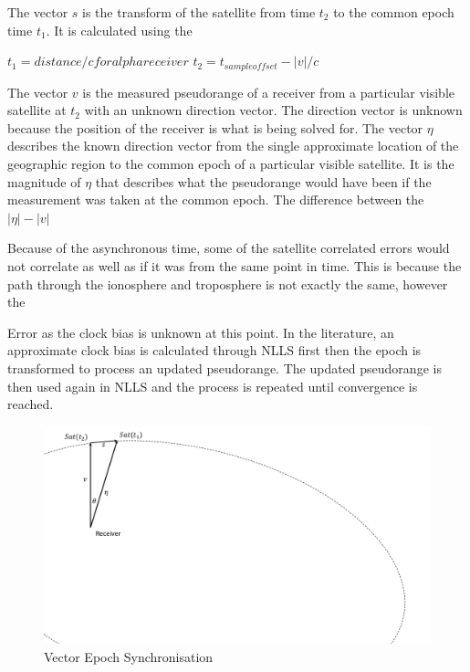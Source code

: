 The vector $s$ is the transform of the satellite from time $t_2$ to the common epoch time $t_1$. It is calculated using the 

$t_1 = distance/c for alpha receiver$
$t_2 = t_{sampleoffset}- |v|/c$

The vector $v$ is the measured pseudorange of a receiver from a particular visible satellite at $t_2$ with an unknown direction vector. The direction vector is unknown because the position of the receiver is what is being solved for. The vector $\eta$ describes the known direction vector from the single approximate location of the geographic region to the common epoch of a particular visible satellite. It is the magnitude of $\eta$ that describes what the pseudorange would have been if the measurement was taken at the common epoch. The difference between the  $|\eta|-|v|$

Because of the asynchronous time, some of the satellite correlated errors would not correlate as well as if it was from the same point in time. This is because the path through the ionosphere and troposphere is not exactly the same, however the 

Error as the clock bias is unknown at this point. In the literature, an approximate clock bias is calculated through NLLS first then the epoch is transformed to process an updated pseudorange. The updated pseudorange is then used again in NLLS and the process is repeated until convergence is reached.

\begin{figure}
\centering
\caption{Vector Epoch Synchronisation}
\label{Fig:epochsync}
\includegraphics[trim=0 10cm 23cm 0,clip,width=0.6\linewidth]{ChapterPerception/Figures/epochalignment.pdf}
\end{figure}









